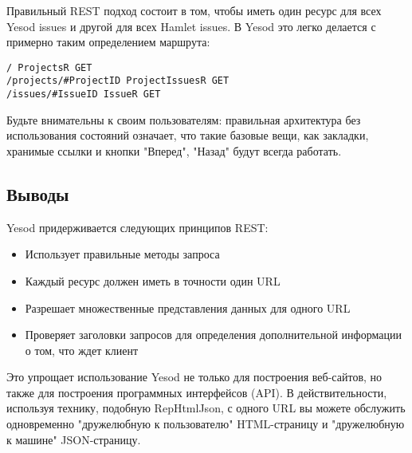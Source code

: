 Правильный REST подход состоит в том, чтобы иметь один ресурс для всех Yesod issues и другой для всех Hamlet issues. В Yesod это легко делается с примерно таким определением маршрута:

\begin{lstlisting}
/ ProjectsR GET
/projects/#ProjectID ProjectIssuesR GET
/issues/#IssueID IssueR GET
\end{lstlisting}

Будьте внимательны к своим пользователям: правильная архитектура без использования состояний означает, что такие базовые вещи, как закладки, хранимые ссылки и кнопки "Вперед", "Назад" будут всегда работать.

\subsection{Выводы}

Yesod придерживается следующих принципов REST:
\begin{itemize}
 \item Использует правильные методы запроса
 \item Каждый ресурс должен иметь в точности один URL
 \item Разрешает множественные представления данных для одного URL
 \item Проверяет заголовки запросов для определения дополнительной информации о том, что ждет клиент
\end{itemize}

Это упрощает использование Yesod не только для построения веб-сайтов, но также для построения программных интерфейсов (API). В действительности, используя технику, подобную RepHtmlJson, с одного URL вы можете обслужить одновременно "дружелюбную к пользователю" HTML-страницу и "дружелюбную к машине" JSON-страницу.






 



